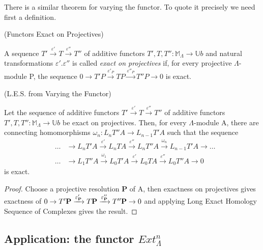 There is a similar theorem for varying the functor. To quote it
precisely we need first a definition.

\begin{definition}(Functors Exact on Projectives\label{df1.5.4})

A sequence $T'\xrightarrow{\varepsilon'}
T\xrightarrow{\varepsilon''} T''$ of additive functors
$T',T,T'':\mathbb M_\Lambda \rightarrow \mathbb Ub$ and natural
transformations $\varepsilon'. \varepsilon''$ is called
\textit{exact on projectives} if, for every projective
$\Lambda$-module P, the sequence $0\rightarrow
T'P\xrightarrow{\varepsilon'_P}
TP\xrightarrow{\varepsilon''_P}T''P\rightarrow 0$ is exact.
\end{definition}

\begin{theorem}(L.E.S. from Varying the Functor\label{df1.5.5}) 

Let the sequence of additive functors
$T'\xrightarrow{\varepsilon'} T\xrightarrow{\varepsilon''} T''$ of
additive functors $T',T,T'':\mathbb M_\Lambda \rightarrow \mathbb
Ub$ be exact on projectives. Then, for every $\Lambda$-module A,
there are connecting homomorphisms $\omega_n:L_nT''A\rightarrow
L_{n-1}T'A$ such that the sequence
\begin{eqnarray}
\nonumber  &\dots&\rightarrow
L_nT'A\xrightarrow{\varepsilon'}L_nTA\xrightarrow{\varepsilon''}L_nT''A\xrightarrow{\omega_n}
L_{n-1}T'A\rightarrow\dots\\
\nonumber  &\dots&\rightarrow L_1T''A\xrightarrow{\omega_1}
L_0T'A\xrightarrow{\varepsilon'} L_0TA\xrightarrow{\varepsilon''}
L_0T''A\rightarrow 0
\end{eqnarray} is exact.

\end{theorem}

\begin{proof}

Choose a projective resolution \textbf P of A, then exactness on
projectives gives exactness of $0\rightarrow T'\textbf
P\xrightarrow{\varepsilon'_\textbf P} T\textbf
P\xrightarrow{\varepsilon''_\textbf P}T''\textbf P\rightarrow 0$
and applying Long Exact Homology Sequence of Complexes gives the
result.
\end{proof}

\subsection{Application: the functor $Ext^n_\Lambda$}\label{df1.6}

